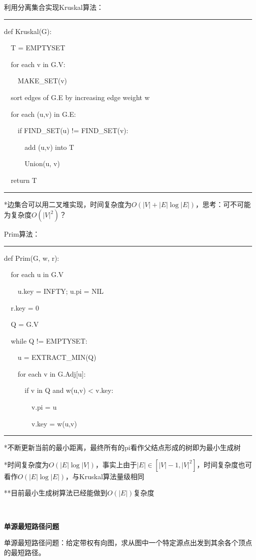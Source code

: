 \documentclass[a4paper,UTF8,fontset=windows]{ctexart}
\newenvironment{code}{\rule{36em}{0.1em}\setlength{\parindent}{1em}

}{

\setlength{\parindent}{0em}\rule{36em}{0.1em}}
\begin{document}
利用分离集合实现Kruskal算法：

\begin{code}
def Kruskal(G):

\ \ T = EMPTYSET

\ \ for each v in G.V:

\ \ \ \ MAKE\_SET(v)

\ \ sort edges of G.E by increasing edge weight w

\ \ for each (u,v) in G.E:

\ \ \ \ if FIND\_SET(u) != FIND\_SET(v):

\ \ \ \ \ \ add (u,v) into T

\ \ \ \ \ \ Union(u, v)

\ \ return T
\end{code}

*\hspace{0em}边集合可以用二叉堆实现，时间复杂度为$O(|V|+|E|\log|E|)$，思考：可不可能为复杂度$O(|V|^2)$？

Prim算法：

\begin{code}
def Prim(G, w, r):

\ \ for each u in G.V

\ \ \ \ u.key = INFTY; u.pi = NIL

\ \ r.key = 0

\ \ Q = G.V

\ \ while Q != EMPTYSET:

\ \ \ \ u = EXTRACT\_MIN(Q)

\ \ \ \ for each v in G.Adj[u]:

\ \ \ \ \ \ if v in Q and w(u,v) < v.key:

\ \ \ \ \ \ \ \ v.pi = u

\ \ \ \ \ \ \ \ v.key = w(u,v)
\end{code}

*\hspace{0em}不断更新当前的最小距离，最终所有的pi看作父结点形成的树即为最小生成树

*\hspace{0em}时间复杂度为$O(|E|\log|V|)$，事实上由于$|E|\in[|V|-1,|V|^2]$，时间复杂度也可看作$O(|E|\log|E|)$，与Kruskal算法量级相同

**\hspace{0em}目前最小生成树算法已经能做到$O(|E|)$复杂度

\

\textbf{单源最短路径问题}

单源最短路径问题：给定带权有向图，求从图中一个特定源点出发到其余各个顶点的最短路径。
\end{document}
